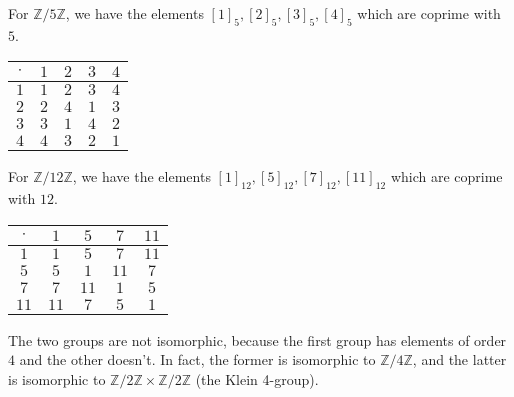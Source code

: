 For $\mathbb{Z}/5\mathbb{Z}$, we have the elements $[1]_5, [2]_5, [3]_5, [4]_5$ which are coprime with $5$.

\vspace{1em}
\begin{tabular}{|c||c|c|c|c|}
\hline
$\cdot$ & $1$ & $2$ & $3$ & $4$ \\ \hline \hline
$1    $ & $1$ & $2$ & $3$ & $4$ \\ \hline
$2    $ & $2$ & $4$ & $1$ & $3$ \\ \hline
$3    $ & $3$ & $1$ & $4$ & $2$ \\ \hline
$4    $ & $4$ & $3$ & $2$ & $1$ \\ \hline
\end{tabular}
\vspace{1em}

For $\mathbb{Z}/12\mathbb{Z}$, we have the elements $[1]_{12}, [5]_{12}, [7]_{12}, [11]_{12}$ which are coprime with $12$.

\vspace{1em}
\begin{tabular}{|c||c|c|c|c|}
\hline
$\cdot$ & $ 1$ & $ 5$ & $ 7$ & $11$ \\ \hline \hline
$1    $ & $ 1$ & $ 5$ & $ 7$ & $11$ \\ \hline
$5    $ & $ 5$ & $ 1$ & $11$ & $ 7$ \\ \hline
$7    $ & $ 7$ & $11$ & $ 1$ & $ 5$ \\ \hline
$11   $ & $11$ & $ 7$ & $ 5$ & $ 1$ \\ \hline
\end{tabular}
\vspace{1em}

The two groups are not isomorphic, because the first group has elements of order $4$ and the other doesn't. In fact, the former is isomorphic to $\mathbb{Z}/4\mathbb{Z}$, and the latter is isomorphic to $\mathbb{Z}/2\mathbb{Z} \times \mathbb{Z}/2\mathbb{Z}$ (the Klein 4-group).

